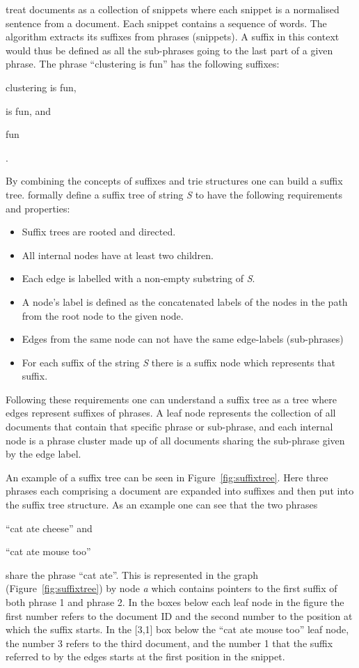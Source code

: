 \cite{Oren1998} treat documents as a collection of snippets where each snippet is a normalised sentence from a document. Each snippet contains a sequence of words. The \STC algorithm extracts its suffixes from phrases (snippets). A suffix in this context would thus be defined as all the sub-phrases going to the last part of a given phrase. The phrase ``clustering is fun'' has the following suffixes:
\begin{inparaenum}[\itshape 1\upshape)]
\item clustering is fun,
\item is fun, and
\item fun
\end{inparaenum}.

By combining the concepts of suffixes and trie structures one can build a suffix tree. \cite{Oren1998} formally define a suffix tree of string \textit{S} to have the following requirements and properties:
\begin{itemize}
\item Suffix trees are rooted and directed.
\item All internal nodes have at least two children.
\item Each edge is labelled with a non-empty substring of \textit{S}.
\item A node's label is defined as the concatenated labels of the nodes in the path from the root node to the given node.
\item Edges from the same node can not have the same edge-labels (sub-phrases)
\item For each suffix of the string \textit{S} there is a suffix node which represents that suffix.
\end{itemize}

Following these requirements one can understand a suffix tree as a tree where edges represent suffixes of phrases. A leaf node represents the collection of all documents that contain that specific phrase or sub-phrase, and each internal node is a phrase cluster made up of all documents sharing the sub-phrase given by the edge label.

An example of a suffix tree can be seen in Figure~\ref{fig:suffixtree}. Here three phrases each comprising a document are expanded into suffixes and then put into the suffix tree structure. As an example one can see that the two phrases
\begin{inparaenum}[\itshape 1\upshape)]
\item ``cat ate cheese'' and
\item ``cat ate mouse too''
\end{inparaenum}
share the phrase ``cat ate''. This is represented in the graph (Figure~\ref{fig:suffixtree}) by node \textit{a} which contains pointers to the first suffix of both phrase 1 and phrase 2. In the boxes below each leaf node in the figure the first number refers to the document ID and the second number to the position at which the suffix starts. In the [3,1] box below the ``cat ate mouse too'' leaf node, the number 3 refers to the third document, and the number 1 that the suffix referred to by the edges starts at the first position in the snippet.


